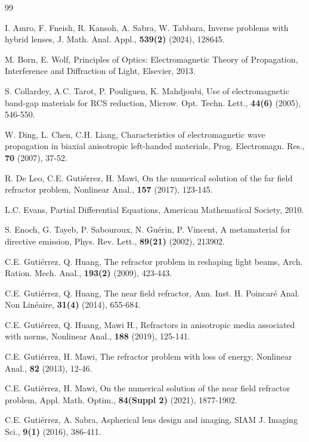 \documentclass[a4paper,12pt,]{article}
\numberwithin{equation}{section}
\numberwithin{equation}{section} \allowdisplaybreaks
\begin{document}
\begin{thebibliography}{99}\addtolength{\itemsep}{-1.5ex}\footnotesize

 I. Amro, F. Fneish, R. Kansoh, A. Sabra, W. Tabbara, Inverse problems with hybrid lenses, J. Math. Anal. Appl., \textbf{539(2)} (2024), 128645.

 M. Born, E. Wolf, Principles of Optics: Electromagnetic Theory of Propagation, Interference and Diffraction of Light, Elsevier, 2013.

 S. Collardey, A.C. Tarot, P. Pouliguen, K. Mahdjoubi, Use of electromagnetic band‐gap materials for RCS reduction, Microw. Opt. Techn. Lett., \textbf{44(6)} (2005), 546-550.

 W. Ding, L. Chen, C.H. Liang, Characteristics of electromagnetic wave propagation in biaxial anisotropic left-handed materials, Prog. Electromagn. Res., \textbf{70} (2007), 37-52.

 R. De Leo, C.E. Gutiérrez, H. Mawi, On the numerical solution of the far field refractor problem, Nonlinear Anal., \textbf{157} (2017), 123-145.

 L.C. Evans, Partial Differential Equations, American Mathematical Society, 2010.

 S. Enoch, G. Tayeb, P. Sabouroux, N. Guérin, P. Vincent, A metamaterial for directive emission, Phys. Rev. Lett., \textbf{89(21)} (2002), 213902.

 C.E. Gutiérrez, Q. Huang, The refractor problem in reshaping light beams, Arch. Ration. Mech. Anal., \textbf{193(2)} (2009), 423-443.

 C.E. Gutiérrez, Q. Huang, The near field refractor, Ann. Inst. H. Poincaré Anal. Non Linéaire, \textbf{31(4)} (2014), 655-684.

 C.E. Gutiérrez, Q. Huang, Mawi H., Refractors in anisotropic media associated with norms, Nonlinear Anal., \textbf{188} (2019), 125-141.

 C.E. Gutiérrez, H. Mawi, The refractor problem with loss of energy, Nonlinear Anal., \textbf{82} (2013), 12-46.

 C.E. Gutiérrez, H. Mawi, On the numerical solution of the near field refractor problem, Appl. Math. Optim., \textbf{84(Suppl 2)} (2021), 1877-1902.

 C.E. Gutiérrez, A. Sabra, Aspherical lens design and imaging, SIAM J. Imaging Sci., \textbf{9(1)} (2016), 386-411.


\end{thebibliography}
\end{document}
